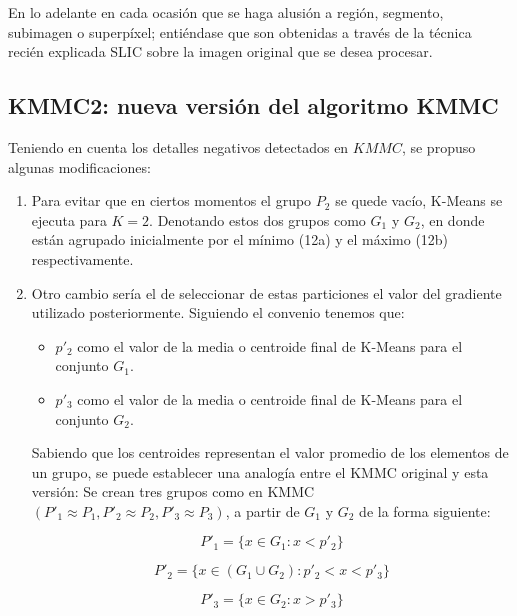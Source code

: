 \documentclass[a4paper,10pt,twocolumn]{article}
\begin{document}
En lo adelante en cada ocasi\'on que se haga alusi\'on a regi\'on, segmento, subimagen o superp\'ixel; enti\'endase que son obtenidas a trav\'es de la t\'ecnica reci\'en explicada SLIC sobre la imagen original que se desea procesar.
\subsection{KMMC2: nueva versi\'on del algoritmo KMMC}\label{sec:kmmc2}

Teniendo en cuenta los detalles negativos detectados en $KMMC$, se propuso algunas modificaciones:

\begin{enumerate} 
\item Para evitar que en ciertos momentos el grupo $P_2$ se quede vac\'io, K-Means se ejecuta para $K=2$. Denotando estos dos grupos como $G_1$ y $G_2$, en donde est\'an agrupado inicialmente por el m\'inimo (12a) y el m\'aximo (12b) respectivamente.
\item Otro cambio ser\'ia el de seleccionar de estas particiones el valor del gradiente utilizado posteriormente. Siguiendo el convenio tenemos que:

\begin{itemize} 
\item $p'_2$ como el valor de la media o centroide final de K-Means para el conjunto $G_1$. 
\item $p'_3$ como el valor de la media o centroide final de K-Means para el conjunto $G_2$. 
\end{itemize}

Sabiendo que los centroides representan el valor promedio de los elementos de un grupo, se  puede establecer una analog\'ia entre el KMMC original y esta versi\'on: Se crean tres grupos como en KMMC $(P'_1 \approx P_1, P'_2 \approx P_2, P'_3 \approx P_3)$, a partir de $G_1$ y $G_2$ de la forma siguiente:

\begin{equation}
	P'_1 = \{x \in G_1 : x < p'_2 \}
\end{equation}

\begin{equation}
P'_2 = \{x \in (G_1 \cup G_2) : p'_2 < x < p'_3 \}
\end{equation}

\begin{equation}
	P'_3 = \{x \in G_2 : x > p'_3 \}
\end{equation}


\end{enumerate}
\end{document}
